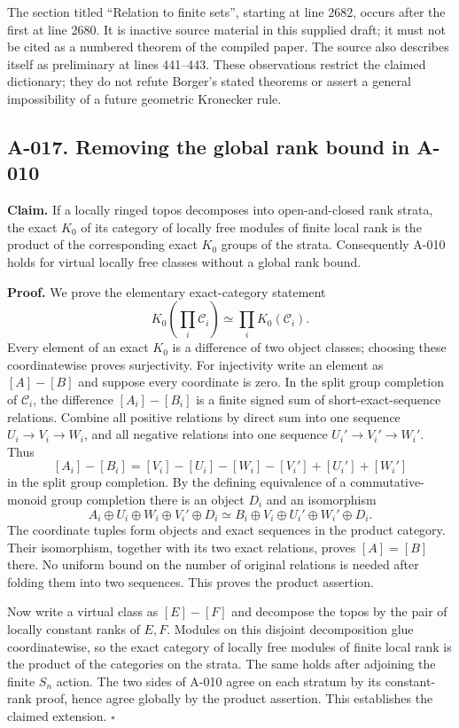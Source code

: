 The section titled ``Relation to finite sets'', starting at line
2682, occurs after the first \verb|| at line 2680.
It is inactive source material in this supplied draft; it must
not be cited as a numbered theorem of the compiled paper. The
source also describes itself as preliminary at lines 441--443.
These observations restrict the claimed dictionary; they do not
refute Borger's stated theorems or assert a general impossibility
of a future geometric Kronecker rule.

\subsection*{A-017. Removing the global rank bound in A-010}
\textbf{Claim.} If a locally ringed topos decomposes into open-and-closed
rank strata, the exact $K_0$ of its category of locally free modules
of finite local rank is the product of the corresponding exact
$K_0$ groups of the strata. Consequently A-010 holds for virtual
locally free classes without a global rank bound.

\textbf{Proof.} We prove the elementary exact-category statement
\[
 K_0\left(\prod_i\mathcal C_i\right)\simeq\prod_iK_0(\mathcal C_i).
\]
Every element of an exact $K_0$ is a difference of two object classes;
choosing these coordinatewise proves surjectivity. For injectivity
write an element as $[A]-[B]$ and suppose every coordinate is zero.
In the split group completion of $\mathcal C_i$, the difference
$[A_i]-[B_i]$ is a finite signed sum of short-exact-sequence
relations. Combine all positive relations by direct sum into
one sequence $U_i\to V_i\to W_i$, and all negative relations into
one sequence $U_i'\to V_i'\to W_i'$. Thus
\[
 [A_i]-[B_i]=[V_i]-[U_i]-[W_i]-[V_i']+[U_i']+[W_i']
\]
in the split group completion. By the defining equivalence of a
commutative-monoid group completion there is an object $D_i$ and
an isomorphism
\[
 A_i\oplus U_i\oplus W_i\oplus V_i'\oplus D_i
 \simeq B_i\oplus V_i\oplus U_i'\oplus W_i'\oplus D_i.
\]
The coordinate tuples form objects and exact sequences in the
product category. Their isomorphism, together with its two exact
relations, proves $[A]=[B]$ there. No uniform bound on the number
of original relations is needed after folding them into two
sequences. This proves the product assertion.

Now write a virtual class as $[E]-[F]$ and decompose the topos by
the pair of locally constant ranks of $E,F$. Modules on this
disjoint decomposition glue coordinatewise, so the exact category
of locally free modules of finite local rank is the product of
the categories on the strata. The same holds after adjoining the
finite $S_n$ action. The two sides of A-010 agree on each stratum
by its constant-rank proof, hence agree globally by the product
assertion. This establishes the claimed extension. \hfill$\square$

